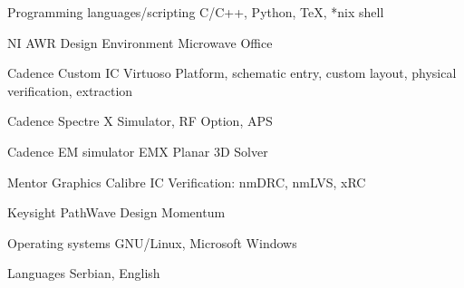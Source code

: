 


\begin{cvskills}


\cvskill
{Programming languages/scripting} %
{C/C++, Python, TeX, *nix shell} %


\cvskill
{NI AWR Design Environment} %
{Microwave Office} %


\cvskill
{Cadence Custom IC} %
{Virtuoso Platform, schematic entry, custom layout, physical verification, extraction} %


\cvskill
{Cadence Spectre X} %
{Simulator, RF Option, APS} %

\cvskill
{Cadence EM simulator} %
{EMX Planar 3D Solver} %


\cvskill
{Mentor Graphics} %
{Calibre IC Verification: nmDRC, nmLVS, xRC} %


\cvskill
{Keysight PathWave Design} %
{Momentum} %

\cvskill
{Operating systems} %
{GNU/Linux, Microsoft Windows} %

\cvskill
{Languages} %
{Serbian, English} %


\end{cvskills}